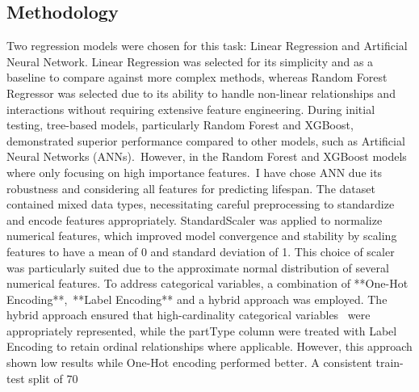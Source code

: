 \documentclass{article}
\begin{document}
\subsection{Methodology}
Two regression models were chosen for this task: Linear Regression and Artificial Neural Network. Linear Regression was selected for its simplicity and as a baseline to compare against more complex methods, whereas Random Forest Regressor was selected due to its ability to handle non-linear relationships and interactions without requiring extensive feature engineering. During initial testing, tree-based models, particularly Random Forest and XGBoost, demonstrated superior performance compared to other models, such as Artificial Neural Networks (ANNs). However, in the Random Forest and XGBoost models where only focusing on high importance features. I have chose ANN due its robustness and considering all features for predicting lifespan.
The dataset contained mixed data types, necessitating careful preprocessing to standardize and encode features appropriately. StandardScaler was applied to normalize numerical features, which improved model convergence and stability by scaling features to have a mean of 0 and standard deviation of 1. This choice of scaler was particularly suited due to the approximate normal distribution of several numerical features.
To address categorical variables, a combination of **One-Hot Encoding**, **Label Encoding** and a hybrid approach was employed. The hybrid approach ensured that high-cardinality categorical variables  were appropriately represented, while the partType column were treated with Label Encoding to retain ordinal relationships where applicable. However, this approach shown low results while One-Hot encoding performed better. A consistent train-test split of 70%
\end{document}
